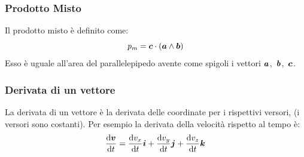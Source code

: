 \begin{figure}[htbp]
\end{figure}

\subsubsection{Prodotto Misto}
Il prodotto misto è definito come:
\begin{equation*}p_m=\boldsymbol{c}\cdot\left(\boldsymbol{a} \wedge \boldsymbol{b}\right)\end{equation*}
Esso è uguale all'area del parallelepipedo avente come spigoli i
vettori \mbox{$\boldsymbol{a}$, $\boldsymbol{b}$, $\boldsymbol{c}$.}

\subsubsection{Derivata di un vettore}
La derivata di un vettore è la derivata delle coordinate per i rispettivi versori, (i versori sono costanti). Per esempio la derivata della velocità rispetto al tempo è:
\begin{equation*}\frac{\mathrm{d}\boldsymbol{v}}{\mathrm{d} t}=\frac{\mathrm{d} v_x}{\mathrm{d} t}\boldsymbol{i}+\frac{\mathrm{d} v_y}{\mathrm{d} t}\boldsymbol{j}+\frac{\mathrm{d} v_z}{\mathrm{d} t}\boldsymbol{k}\end{equation*}

